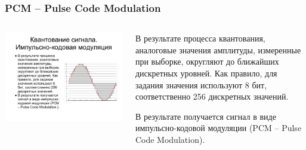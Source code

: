 \documentclass[utf8]{beamer}
\begin{document}
\begin{frame}
\frametitle{PCM -- Pulse Code Modulation}
\begin{columns}
\begin{block}{}
\centering
\includegraphics[width=1.1\textwidth]{pic/pcm.pdf}
\end{block}
\begin{block}{}
В результате процесса квантования, аналоговые значения амплитуды, измеренные при выборке, округляют до ближайших дискретных уровней. Как правило, для задания значения используют 8 бит, соответственно 256 дискретных значений.

В результате получается сигнал в виде импульсно-кодовой модуляции (PCM – Pulse Code Modulation).
\end{block}
\end{columns}
\end{frame}
\end{document}
